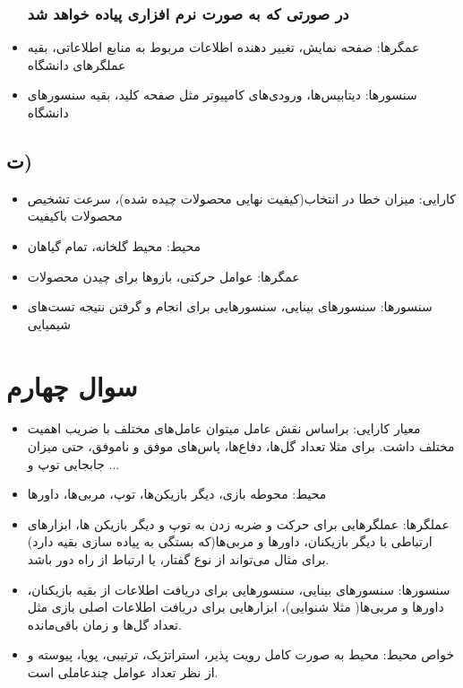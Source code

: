 \documentclass{article}
\begin{document}
\begin{itemize}
\subsubsection*{در صورتی که به صورت نرم افزاری پیاده خواهد شد}

\item عمگرها:
صفحه نمایش، تغییر دهنده اطلاعات مربوط به منابع اطلاعاتی، بقیه عملگر‌های دانشگاه

\item سنسورها: 
دیتابیس‌ها، ورودی‌های کامپیوتر مثل صفحه کلید، بقیه سنسورهای دانشگاه
\end{itemize}


\subsection*{ت)}
\begin{itemize}
	\item کارایی:
میزان خطا در انتخاب(کیفیت نهایی محصولات چیده شده)، سرعت تشخیص محصولات باکیفیت

	\item محیط:
محیط گلخانه، تمام گیاهان

	\item عمگرها:
عوامل حرکتی، بازوها برای چیدن محصولات

	\item سنسورها: 
سنسورهای بینایی، سنسورهایی برای انجام و گرفتن نتیجه تست‌های شیمیایی

\end{itemize}

\section*{سوال چهارم}
\begin{itemize}
	\item معیار کارایی:
		براساس نقش عامل میتوان عامل‌های مختلف با ضریب اهمیت مختلف داشت. برای مثلا تعداد گل‌ها، دفاع‌ها، پاس‌های موفق و ناموفق، حتی میزان جابجایی توپ و ...

	\item محیط:
	محوطه بازی، دیگر بازیکن‌ها، توپ، مربی‌ها، داورها

	\item عملگر‌ها:
	عملگر‌هایی برای حرکت و ضربه زدن به توپ و دیگر بازیکن ها، ابزار‌های ارتباطی با دیگر بازیکنان، داورها و مربی‌ها(که بستگی به پیاده سازی بقیه دارد) برای مثال می‌تواند از نوع گفتار، یا ارتباط از راه دور باشد.

	\item سنسورها: 
	سنسور‌های بینایی، سنسورهایی برای دریافت اطلاعات از بقیه‌ بازیکنان، داور‌ها و مربی‌ها( مثلا شنوایی)، ابزارهایی برای دریافت اطلاعات اصلی بازی مثل تعداد گل‌ها و زمان باقی‌مانده.
	\item خواص محیط:
محیط به صورت کامل رویت پذیر، استراتژیک، ترتیبی، پویا، پیوسته و از نظر تعداد عوامل چندعاملی است.
\end{itemize}
\end{document}
